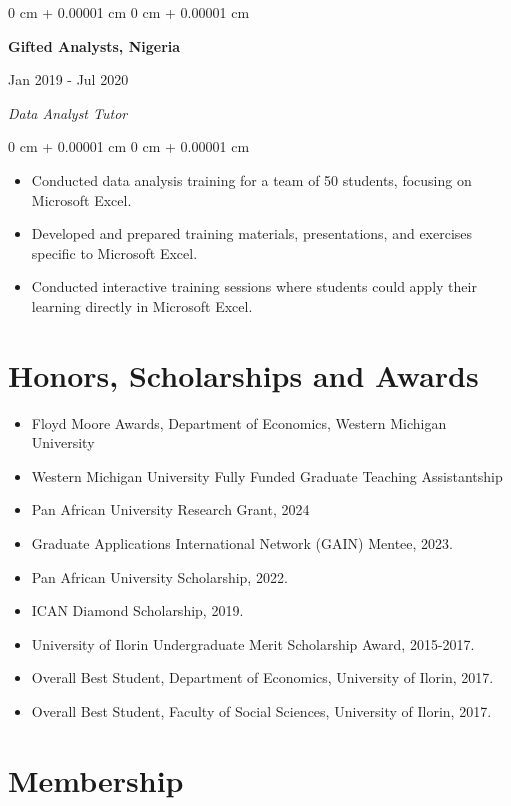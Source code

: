 \documentclass[10pt, letterpaper]{article}
\newenvironment{onecolentry}{
    \begin{adjustwidth}{
        0 cm + 0.00001 cm
    }{
        0 cm + 0.00001 cm
    }
}{
    \end{adjustwidth}
} %
\newenvironment{twocolentry}[2][]{
    \onecolentry
    \def\secondColumn{#2}
    \setcolumnwidth{\fill, 4.5 cm}
    \begin{paracol}{2}
}{
    \switchcolumn \raggedleft \secondColumn
    \end{paracol}
    \endonecolentry
} %
\begin{document}
\vspace{0.6 cm}

\begin{twocolentry}{
Jan 2019 - Jul 2020
}
    \textbf{Gifted Analysts, Nigeria}
\end{twocolentry}
\textit{Data Analyst Tutor}
\begin{onecolentry}
    \begin{itemize}
    \item Conducted data analysis training for a team of 50 students, focusing on Microsoft Excel.
    \item Developed and prepared training materials, presentations, and exercises specific to Microsoft Excel.
    \item Conducted interactive training sessions where students could apply their learning directly in Microsoft Excel.
\end{itemize}
\end{onecolentry}
          

\section{Honors, Scholarships and Awards}
    
       \begin{itemize}
        \item Floyd Moore Awards, Department of Economics, Western Michigan University
           \item  Western Michigan University Fully Funded Graduate Teaching Assistantship
           \item Pan African University Research Grant, 2024
           \item Graduate Applications International Network (GAIN) Mentee, 2023. 
           \item Pan African University Scholarship, 2022. 
           \item ICAN Diamond Scholarship, 2019.
           \item University of Ilorin Undergraduate Merit Scholarship Award, 2015-2017. 
           \item  Overall Best Student, Department of Economics, University of Ilorin, 2017. 
           \item Overall Best Student, Faculty of Social Sciences, University of Ilorin, 2017. 

       \end{itemize}


        \section{Membership}
\end{document}
